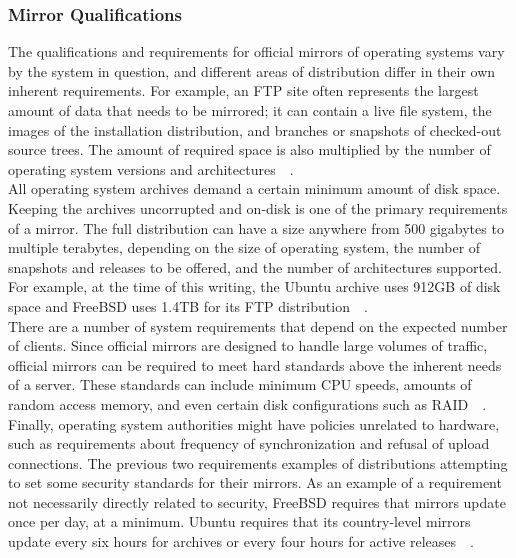 \documentclass[conference]{IEEEtran}
\begin{document}
\subsubsection{Mirror Qualifications}
The qualifications and requirements for official mirrors of operating systems
vary by the system in question, and different areas of distribution
differ in their own inherent requirements.
For example, an FTP site often represents the largest amount of data
that needs to be mirrored; it can contain a live file system,
the images of the installation distribution, and branches
or snapshots of checked-out source trees.
The amount of required space is also multiplied
by the number of operating system versions and architectures~\cite{ubuntumirror}~\cite{freebsdrequirements}.\\
\indent All operating system archives demand a certain minimum
amount of disk space. Keeping the archives uncorrupted and on-disk is
one of the primary requirements of a mirror.
The full distribution can have a size anywhere from 500 gigabytes to
multiple terabytes, depending on the size of operating system,
the number of snapshots and releases to be offered, and the number of
architectures supported. For example, at the time of this writing,
the Ubuntu archive uses 912GB of disk space and FreeBSD uses 1.4TB for its FTP distribution~\cite{ubuntumirror}~\cite{freebsdrequirements}.\\
\indent There are a number of system requirements that depend on
the expected number of clients. Since official mirrors are designed
to handle large volumes of traffic, official mirrors can be required to
meet hard standards above the inherent needs of a server.
These standards can include minimum CPU speeds, amounts of random access
memory, and even certain disk configurations such as RAID~\cite{ubuntumirror}~\cite{freebsdrequirements}.\\
\indent Finally, operating system authorities might have policies
unrelated to hardware, such as requirements about frequency of synchronization and refusal of upload connections. The previous
two requirements examples of distributions attempting to set some security standards for their mirrors.
As an example of a requirement not necessarily directly related to security, FreeBSD requires
that mirrors update once per day, at a minimum. Ubuntu requires that its country-level mirrors
update every six hours for archives or every four hours for active releases~\cite{ubuntumirror}~\cite{freebsdrequirements}.
\end{document}
